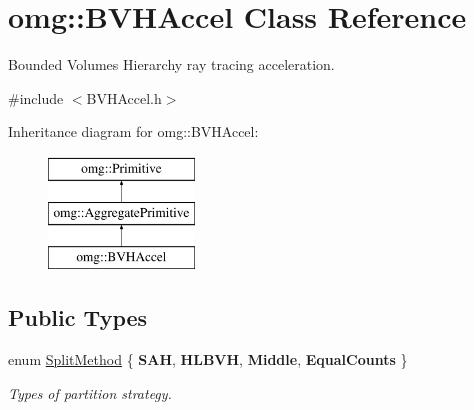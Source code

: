 \hypertarget{classomg_1_1_b_v_h_accel}{}\section{omg\+::B\+V\+H\+Accel Class Reference}
\label{classomg_1_1_b_v_h_accel}


Bounded Volumes Hierarchy ray tracing acceleration.  




{\ttfamily \#include $<$B\+V\+H\+Accel.\+h$>$}

Inheritance diagram for omg\+::B\+V\+H\+Accel\+:\begin{figure}[H]
\begin{center}
\leavevmode
\includegraphics[height=3.000000cm]{classomg_1_1_b_v_h_accel}
\end{center}
\end{figure}
\subsection*{Public Types}
\begin{DoxyCompactItemize}
\item 
\mbox{\label{classomg_1_1_b_v_h_accel_a76a87ca6ffce37773ad59bc4d540c33f}} 
enum \mbox{\hyperlink{classomg_1_1_b_v_h_accel_a76a87ca6ffce37773ad59bc4d540c33f}{Split\+Method}} \{ {\bfseries S\+AH}, 
{\bfseries H\+L\+B\+VH}, 
{\bfseries Middle}, 
{\bfseries Equal\+Counts}
 \}
\begin{DoxyCompactList}\small\item\em Types of partition strategy. \end{DoxyCompactList}\end{DoxyCompactItemize}
